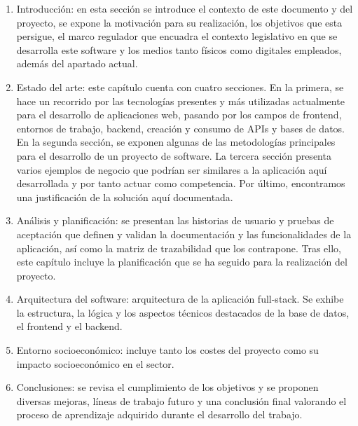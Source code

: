 \begin{enumerate}
    \item Introducción: en esta sección se introduce el contexto de este documento y del proyecto, se expone la motivación para su realización, los objetivos que esta persigue, el marco regulador que encuadra el contexto legislativo en que se desarrolla este software y los medios tanto físicos como digitales empleados, además del apartado actual.

    \item Estado del arte: este capítulo cuenta con cuatro secciones. En la primera, se hace un recorrido por las tecnologías presentes y más utilizadas actualmente para el desarrollo de aplicaciones web, pasando por los campos de frontend, entornos de trabajo, backend, creación y consumo de APIs y bases de datos. En la segunda sección, se exponen algunas de las metodologías principales para el desarrollo de un proyecto de software. La tercera sección presenta varios ejemplos de negocio que podrían ser similares a la aplicación aquí desarrollada y por tanto actuar como competencia. Por último, encontramos una justificación de la solución aquí documentada.

    \item Análisis y planificación: se presentan las historias de usuario y pruebas de aceptación que definen y validan la documentación y las funcionalidades de la aplicación, así como la matriz de trazabilidad que los contrapone. Tras ello, este capítulo incluye la planificación que se ha seguido para la realización del proyecto.

    \item Arquitectura del software: arquitectura de la aplicación full-stack. Se exhibe la estructura, la lógica y los aspectos técnicos destacados de la base de datos, el frontend y el backend.

    \item Entorno socioeconómico: incluye tanto los costes del proyecto como su impacto socioeconómico en el sector.

    \item Conclusiones: se revisa el cumplimiento de los objetivos y se proponen diversas mejoras, líneas de trabajo futuro y una conclusión final valorando el proceso de aprendizaje adquirido durante el desarrollo del trabajo.
\end{enumerate}